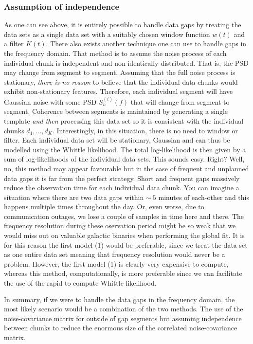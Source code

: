 \documentclass{article}
\begin{document}
\subsubsection{Assumption of independence}
As one can see above, it is entirely possible to handle data gaps by treating the data sets as a single data set with a suitably chosen window function $w(t)$ and a filter $K(t)$. There also exists another technique one can use to handle gaps in the frequency domain. That method is to assume the noise process of each individual chunk is independent and non-identically distributed. That is, the PSD may change from segment to segment. Assuming that the full noise process is stationary, \emph{there is no reason} to believe that the individual data chunks would exhibit non-stationary features. Therefore, each individual segment will have Gaussian noise with some PSD $S^{(i)}_{n}(f)$ that will change from segment to segment. Coherence between segments is maintained by generating a single template \emph{and then} processing this data set so it is consistent with the individual chunks $d_{1}, \ldots, d_{K}$. Interestingly, in this situation, there is no need to window or filter. Each individual data set will be stationary, Gaussian and can thus be modelled using the Whittle likelihood. The total log-likelihood is then given by a sum of log-likelihoods of the individual data sets. This sounds easy. Right? Well, no, this method may appear favourable but in the case of frequent and unplanned data gaps it is far from the perfect strategy. Short and frequent gaps massively reduce the observation time for each individual data chunk. You can imagine a situation where there are two data gaps within $\sim ~5$ minutes of each-other and this happens multiple times throughout the day. Or, even worse, due to communication outages, we lose a couple of samples in time here and there. The frequency resolution during these oservation period might be so weak that we would miss out on valuable galactic binaries when performing the global fit. It is for this reason the first model (1) would be preferable, since we treat the data set as one entire data set meaning that frequency resolution would never be a problem. However, the first model (1) is clearly very expensive to compute, whereas this method, computationally, is more preferable since we can facilitate the use of the rapid to compute Whittle likelihood.

In summary, if we were to handle the data gaps in the frequency domain, the most likely scenario would be a combination of the two methods. The use of the noise-covariance matrix for outside of gap segments but assuming independence between chunks to reduce the enormous size of the correlated noise-covariance matrix. 
\end{document}
